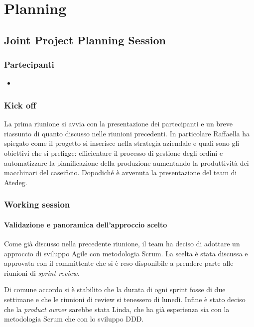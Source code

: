 \chapter{Planning}\label{ch:planning}

\section{Joint Project Planning Session}\label{sec:JPPS}

\subsection{Partecipanti}
\begin{itemize}
  \item {}
\end{itemize}

\subsection{Kick off}
La prima riunione si avvia con la presentazione dei partecipanti e un breve riassunto di quanto discusso nelle riunioni precedenti. In particolare Raffaella ha spiegato come il progetto si inserisce nella strategia aziendale e quali sono gli obiettivi che si prefigge: efficientare il processo di gestione degli ordini e automatizzare la pianificazione della produzione aumentando la produttività dei macchinari del caseificio.
Dopodiché è avvenuta la presentazione del team di Atedeg.

\subsection{Working session}

\subsubsection{Validazione e panoramica dell'approccio scelto}
Come già discusso nella precedente riunione, il team ha deciso di adottare un approccio di sviluppo Agile con metodologia Scrum. La scelta è stata discussa e approvata con il committente che si è reso disponibile a prendere parte alle riunioni di \emph{sprint review}.

Di comune accordo si è stabilito che la durata di ogni sprint fosse di due settimane e che le riunioni di review si tenessero di lunedì. Infine è stato deciso che la \emph{product owner} sarebbe stata Linda, che ha già esperienza sia con la metodologia Scrum che con lo sviluppo DDD.

